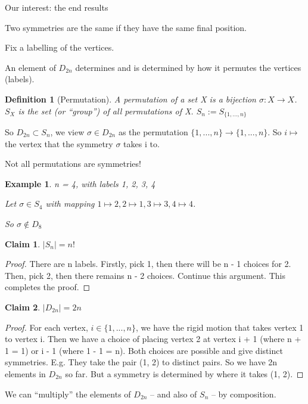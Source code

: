 \documentclass[11pt, oneside]{book}
\theoremstyle{break}
\newtheorem*{proof}{Proof}
\newtheorem{claim}{Claim}[section]
\newtheorem{defn}{Definition}[section]
\newtheorem{eg}{Example}[section]
\begin{document}
Our interest: the end results

Two symmetries are the same if they have the same final position.

Fix a labelling of the vertices.

An element of $D_{2n}$ determines and is determined by how it permutes the vertices (labels).

\begin{defn}[Permutation]
	A permutation of a set X is a bijection $\sigma: X \to X$. $S_X$ is the set (or ``group'') of all permutations of X.
	$S_n := S_{\{1, ..., n\}}$
\end{defn}

So $D_{2n} \subset S_n$, we view $\sigma \in D_{2n}$ as the permutation $\{1, ..., n\} \to \{1, ..., n\}$. So $i \mapsto$ the vertex that the symmetry $\sigma$ takes i to.

Not all permutations are symmetries!

\begin{eg}
	n = 4, with labels 1, 2, 3, 4

	Let $\sigma \in S_4$ with mapping $1 \mapsto 2, 2 \mapsto 1, 3 \mapsto 3, 4 \mapsto 4$.

	So $\sigma \notin D_8$
\end{eg}

\begin{claim}
	$|S_n| = n!$
\end{claim}

\begin{proof}
	There are n labels. Firstly, pick 1, then there will be n - 1 choices for 2. Then, pick 2, then there remains n - 2 choices. Continue this argument. This completes the proof.
\end{proof}

\begin{claim}
	$|D_{2n}| = 2n$
\end{claim}

\begin{proof}
	For each vertex, $i \in \{1, ..., n\}$, we have the rigid motion that takes vertex 1 to vertex i. Then we have a choice of placing vertex 2 at vertex i + 1 (where n + 1 = 1) or i - 1 (where 1 - 1 = n). Both choices are possible and give distinct symmetries. E.g. They take the pair (1, 2) to distinct pairs. So we have 2n elements in $D_{2n}$ so far. But a symmetry is determined by where it takes (1, 2).
\end{proof}

We can ``multiply'' the elements of $D_{2n}$ -- and also of $S_n$ -- by composition.
\end{document}
